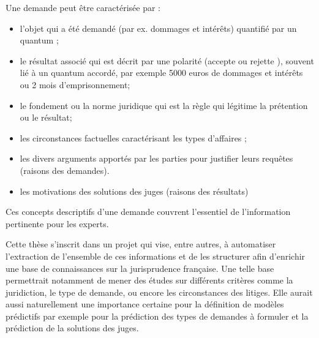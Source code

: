 Une demande peut être caractérisée par :
 \begin{itemize}
 	\item l'objet qui a été demandé (par ex. dommages et intérêts) quantifié par un quantum ;
	\item le résultat associé qui est décrit par une polarité (\og accepte \fg{} ou \og rejette \fg{}), souvent lié à un quantum accordé, par exemple 5000 euros de dommages et intérêts ou 2 mois d'emprisonnement;
	\item le fondement ou la norme juridique qui est la règle qui légitime la prétention ou le résultat;	
	\item les circonstances factuelles caractérisant les types d'affaires ;
	\item les divers arguments apportés par les parties pour justifier leurs requêtes  (raisons des demandes).
	\item les motivations des solutions des juges (raisons des résultats)
 \end{itemize}

Ces concepts descriptifs d'une demande couvrent l'essentiel de l'information pertinente pour les experts. 

Cette thèse s'inscrit dans un projet qui vise, entre autres, à automatiser l'extraction de l'ensemble de ces informations et de les structurer afin d'enrichir une base de connaissances sur la jurisprudence française. Une telle base permettrait notamment de mener des études sur différents critères comme la juridiction, le type de demande, ou encore les circonstances des litiges. Elle aurait aussi naturellement une importance certaine pour la définition de modèles prédictifs par exemple pour la prédiction des types de demandes à formuler et la prédiction de la solutions des juges. 


